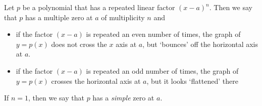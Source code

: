\begin{pccdefinition}\label{poly:def:multzero}
Let $p$ be a polynomial that has a repeated linear factor $(x-a)^n$. Then we say
that $p$ has a multiple zero at $a$ of multiplicity $n$ and 
\begin{itemize}
	\item if the factor $(x-a)$ is repeated an even number of times, the graph of $y=p(x)$ does not
		cross the $x$ axis at $a$, but `bounces' off the horizontal axis at $a$.
	\item if the factor $(x-a)$ is repeated an odd number of times, the graph of $y=p(x)$ crosses the
		horizontal axis at $a$, but it looks `flattened' there
\end{itemize}
If $n=1$, then we say that $p$ has a \emph{simple} zero at $a$.
\end{pccdefinition}

